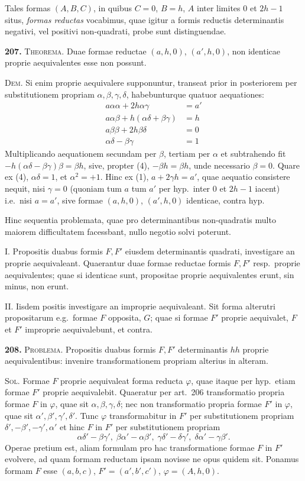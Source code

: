 \documentclass[12pt,a4paper]{article}
\theoremstyle{plain}
\theoremstyle{definition}
\theoremstyle{remark}
\begin{document}
Tales formas $(A,B,C)$, in quibus $C=0$, $B=h$, $A$ inter limites $0$ et $2h-1$ situs, \emph{formas reductas} vocabimus, quae igitur a formis reductis determinantis negativi, vel positivi non-quadrati, probe sunt distinguendae.

\textbf{207.} \textsc{Theorema.} Duae formae reductae $(a,h,0)$, $(a',h,0)$, non identicae proprie aequivalentes esse non possunt.

\textsc{Dem.} Si enim proprie aequivalere supponuntur, transeat prior in posteriorem per substitutionem propriam $\alpha,\beta,\gamma,\delta$, habebunturque quatuor aequationes:
\begin{align*}
a\alpha\alpha+2h\alpha\gamma &= a' \tag{1} \\
a\alpha\beta+h(\alpha\delta+\beta\gamma) &= h \tag{2} \\
a\beta\beta+2h\beta\delta &= 0 \tag{3} \\
\alpha\delta-\beta\gamma &= 1 \tag{4}
\end{align*}
Multiplicando aequationem secundam per $\beta$, tertiam per $\alpha$ et subtrahendo fit $-h(\alpha\delta-\beta\gamma)\beta=\beta h$, sive, propter (4), $-\beta h=\beta h$, unde necessario $\beta=0$. Quare ex (4), $\alpha\delta=1$, et $\alpha^2=+1$. Hinc ex (1), $a+2\gamma h=a'$, quae aequatio consistere nequit, nisi $\gamma=0$ (quoniam tum $a$ tum $a'$ per hyp.\ inter $0$ et $2h-1$ iacent) i.e.\ nisi $a=a'$, sive formae $(a,h,0)$, $(a',h,0)$ identicae, contra hyp.

Hinc sequentia problemata, quae pro determinantibus non-quadratis multo maiorem difficultatem facessbant, nullo negotio solvi poterunt.

\textsc{I.} Propositis duabus formis $F,F'$ eiusdem determinantis quadrati, investigare an proprie aequivaleant. Quaerantur duae formae reductae formis $F,F'$ resp.\ proprie aequivalentes; quae si identicae sunt, propositae proprie aequivalentes erunt, sin minus, non erunt.

\textsc{II.} Iisdem positis investigare an improprie aequivaleant. Sit forma alterutri propositarum e.g.\ formae $F$ opposita, $G$; quae si formae $F'$ proprie aequivalet, $F$ et $F'$ improprie aequivalebunt, et contra.

\textbf{208.} \textsc{Problema.} Propositis duabus formis $F,F'$ determinantis $hh$ proprie aequivalentibus: invenire transformationem propriam alterius in alteram.

\textsc{Sol.} Formae $F$ proprie aequivaleat forma reducta $\varphi$, quae itaque per hyp.\ etiam formae $F'$ proprie aequivalebit. Quaeratur per art.~206 transformatio propria formae $F$ in $\varphi$, quae sit $\alpha,\beta,\gamma,\delta$; nec non transformatio propria formae $F'$ in $\varphi$, quae sit $\alpha',\beta',\gamma',\delta'$. Tunc $\varphi$ transformabitur in $F'$ per substitutionem propriam $\delta',-\beta',-\gamma',\alpha'$ et hinc $F$ in $F'$ per substitutionem propriam
\[
\alpha\delta'-\beta\gamma',\; \beta\alpha'-\alpha\beta',\; \gamma\delta'-\delta\gamma',\; \delta\alpha'-\gamma\beta'.
\]
Operae pretium est, aliam formulam pro hac transformatione formae $F$ in $F'$ evolvere, ad quam formam reductam ipsam novisse ne opus quidem sit. Ponamus formam $F$ esse $(a,b,c)$, $F'=(a',b',c')$, $\varphi=(A,h,0)$.
\end{document}
